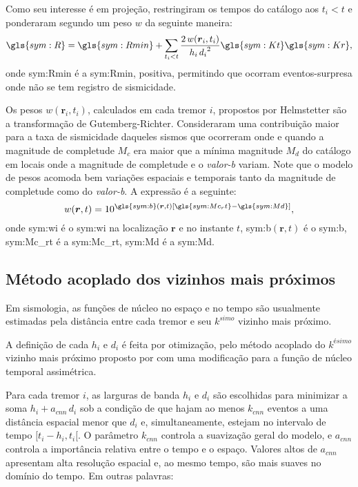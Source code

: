Como seu interesse é em projeção, restringiram os tempos do catálogo aos $t_i
< t$ e ponderaram segundo um peso $w$ da seguinte maneira:
\begin{equation}
\ensuremath{\gls{sym:R} = \gls{sym:Rmin} + \sum_{t_i < t}{ 
	\frac{2\,w(\boldsymbol{r}_i,t_i)}{h_i\,{d_i}^2}
			\gls{sym:Kt}\gls{sym:Kr} }},
	\label{eq:helms02}
\end{equation}
onde \gls{sym:Rmin} é a \glsdesc{sym:Rmin}, positiva, permitindo que ocorram eventos-surpresa 
onde não se tem registro de sismicidade.

Os pesos $w(\boldsymbol{r}_i,t_i)$, calculados em cada tremor $i$, propostos por Helmstetter são a transformação de
Gutemberg-Richter. Consideraram uma contribuição maior para a taxa de sismicidade daqueles sismos 
que ocorreram onde e quando a magnitude de completude $M_c$ era maior que 
a mínima magnitude $M_d$ do catálogo 
em locais onde a magnitude de completude e o \emph{valor-b} variam. 
Note que o modelo de pesos acomoda bem variações espaciais e
temporais tanto da magnitude de completude como do \emph{valor-b}. A expressão é a seguinte:
\begin{equation}
	\ensuremath{ w(\boldsymbol{r},t) = 10^{ \gls{sym:b}(\boldsymbol{r},t) \left[ \gls{sym:Mc_rt} - \gls{sym:Md}
	\right] } },
	\label{eq:helms_wi}
\end{equation}
onde  \gls{sym:wi} é o \glsdesc{sym:wi} na localização $\boldsymbol{r}$ e no instante $t$, 
	  \gls{sym:b}$(\boldsymbol{r},t)$ é o \glsdesc{sym:b}, 
	  \gls{sym:Mc_rt} é a \glsdesc{sym:Mc_rt}, 
	  \gls{sym:Md} é a \glsdesc{sym:Md}.

\subsection{Método acoplado dos vizinhos mais próximos}

Em sismologia, as funções de núcleo no espaço e no tempo são usualmente estimadas
pela distância entre cada tremor e seu $k^{simo}$ vizinho mais próximo. 

A definição de cada $h_i$ e $d_i$ é feita por otimização, 
pelo método acoplado do $k^{ésimo}$ vizinho mais próximo
proposto por \citet{choi_1999}
com uma modificação para a função de núcleo temporal assimétrica.

Para cada tremor $i$, as larguras de banda  $h_i$ e $d_i$ são escolhidas para
minimizar a soma $h_i + a_{cnn}\,d_i$ sob a condição de que hajam ao menos $k_{cnn}$
eventos a uma distância espacial menor que $d_i$ e, simultaneamente, estejam
no intervalo de tempo $[t_i - h_i, t_i[$. O parâmetro $k_{cnn}$ controla a suavização 
geral do modelo, e $a_{cnn}$ controla a importância relativa entre o tempo e o espaço.
Valores altos de $a_{cnn}$ apresentam alta resolução espacial e, ao mesmo tempo, 
são mais suaves no domínio do tempo. Em outras palavras:

